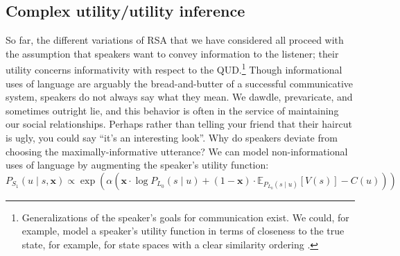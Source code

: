 \documentclass[10pt,letterpaper]{article}
\begin{document}
\subsection*{Complex utility/utility inference}
\label{sec:compl-util-infer}
 
 So far, the different variations of RSA that we have considered all proceed with the assumption that speakers want to convey information to the listener; their utility concerns informativity with respect to the QUD.\footnote{Generalizations of the speaker's goals for communication exist. We could, for example, model a speaker's utility function in terms of closeness to the true state, for example, for state spaces with a clear similarity ordering \cite{Franke2014:Typical-use-of-}.} Though informational uses of language are arguably the bread-and-butter of a successful communicative system, speakers do not always say what they mean. We dawdle, prevaricate, and sometimes outright lie, and this behavior is often in the service of maintaining our social relationships. Perhaps rather than telling your friend that their haircut is ugly, you could say ``it's an interesting look''. Why do speakers deviate from choosing the maximally-informative utterance? We can model non-informational uses of language by augmenting the speaker's utility function: 
%
 \begin{equation} \label{S1-polite}
P_{S_1}(u \mid s, \textbf{x}) \propto \exp (\alpha  (
 \textbf{x} \cdot \log P_{L_0}(s \mid u) +
 (1 - \textbf{x}) \cdot  \mathbb{E}_{P_{L_0}(s \mid u)}[V(s)] - C(u)))
\end{equation}
\end{document}
